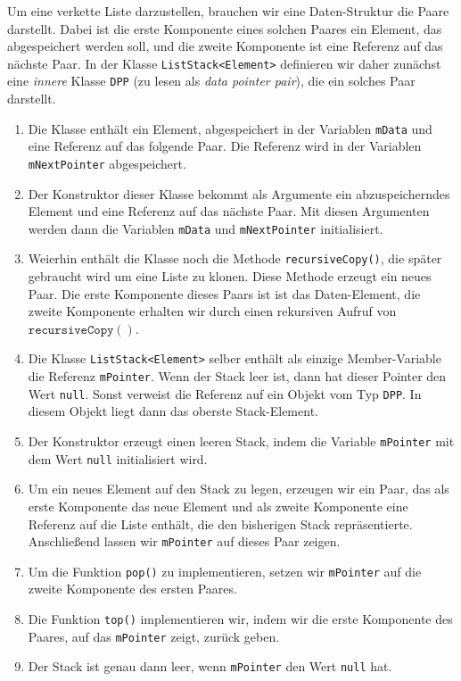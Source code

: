 Um eine verkette Liste darzustellen, brauchen wir eine Daten-Struktur die Paare darstellt.
Dabei ist die erste Komponente eines solchen Paares ein Element, das abgespeichert werden
soll, und die zweite Komponente ist eine Referenz auf das n\"achste Paar.
In der Klasse \texttt{ListStack<Element>} definieren wir daher zun\"achst 
eine \emph{innere} Klasse \texttt{DPP} (zu lesen als \emph{data pointer pair}),
die ein solches Paar darstellt.
\begin{enumerate}
\item Die Klasse enth\"alt ein Element, abgespeichert in der Variablen \texttt{mData}
      und eine Referenz auf das folgende Paar.  Die Referenz wird in der Variablen
      \texttt{mNextPointer} abgespeichert.
\item Der Konstruktor dieser Klasse bekommt als Argumente ein abzuspeicherndes Element
      und eine Referenz auf das n\"achste Paar.  Mit diesen Argumenten werden dann die
      Variablen \texttt{mData} und \texttt{mNextPointer} initialisiert.
\item Weierhin enth\"alt die Klasse noch die Methode \texttt{recursiveCopy()},
      die sp\"ater gebraucht wird um eine Liste zu klonen.  Diese Methode erzeugt ein neues
      Paar.  Die erste Komponente dieses Paars ist ist das Daten-Element, die zweite
      Komponente erhalten wir durch einen rekursiven Aufruf von
      $\texttt{recursiveCopy}()$.  
\item Die Klasse \texttt{ListStack<Element>} selber enth\"alt als einzige Member-Variable
      die Referenz \texttt{mPointer}.  Wenn der Stack leer ist, dann hat dieser Pointer
      den Wert \texttt{null}. Sonst verweist die Referenz auf ein Objekt vom Typ \texttt{DPP}.
      In diesem Objekt liegt dann das oberste Stack-Element.
\item Der Konstruktor erzeugt einen leeren Stack, indem die Variable \texttt{mPointer} mit
      dem Wert \texttt{null} initialisiert wird.
\item Um ein neues Element auf den Stack zu legen, erzeugen wir ein Paar, das als erste
      Komponente das neue Element und als zweite Komponente eine Referenz auf die Liste
      enth\"alt, die den bisherigen Stack repr\"asentierte.  Anschlie{\ss}end lassen wir
      \texttt{mPointer} auf dieses Paar zeigen.
\item Um die Funktion \texttt{pop()} zu implementieren, setzen wir \texttt{mPointer}
      auf die zweite Komponente des ersten Paares.
\item Die Funktion \texttt{top()} implementieren wir, indem wir die erste Komponente des
      Paares, auf das \texttt{mPointer} zeigt, zur\"uck geben.
\item Der Stack ist genau dann leer, wenn \texttt{mPointer} den Wert \texttt{null} hat.
\end{enumerate}
